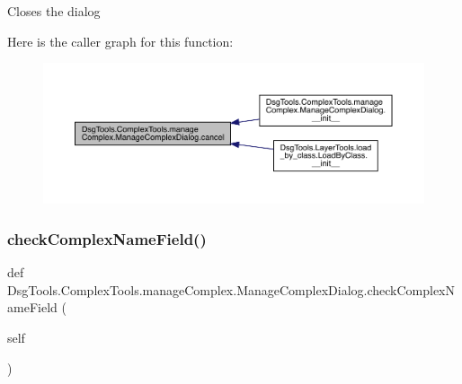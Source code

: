 \begin{DoxyVerb}Closes the dialog
\end{DoxyVerb}
 Here is the caller graph for this function\+:
\nopagebreak
\begin{figure}[H]
\begin{center}
\leavevmode
\includegraphics[width=350pt]{class_dsg_tools_1_1_complex_tools_1_1manage_complex_1_1_manage_complex_dialog_a36d847297beea2c4cea85bcf0c4b6c90_icgraph}
\end{center}
\end{figure}
\mbox{\label{class_dsg_tools_1_1_complex_tools_1_1manage_complex_1_1_manage_complex_dialog_a328662e0ada620af3647acdc87a7b111}} 
\subsubsection{\texorpdfstring{check\+Complex\+Name\+Field()}{checkComplexNameField()}}
{\footnotesize\ttfamily def Dsg\+Tools.\+Complex\+Tools.\+manage\+Complex.\+Manage\+Complex\+Dialog.\+check\+Complex\+Name\+Field (\begin{DoxyParamCaption}\item[{}]{self }\end{DoxyParamCaption})}

